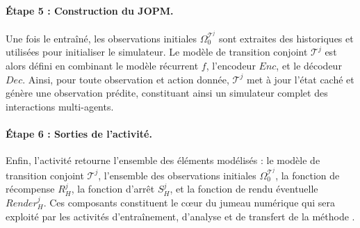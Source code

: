 \paragraph{Étape 5 : Construction du JOPM.}
Une fois le  entraîné, les observations initiales $\Omega^{\mathcal{T}^j}_0$ sont extraites des historiques et utilisées pour initialiser le simulateur.
Le modèle de transition conjoint $\mathcal{T}^j$ est alors défini en combinant le modèle récurrent $f$, l'encodeur $Enc$, et le décodeur $Dec$.
Ainsi, pour toute observation et action donnée, $\mathcal{T}^j$ met à jour l'état caché et génère une observation prédite, constituant ainsi un simulateur complet des interactions multi-agents.

\paragraph{Étape 6 : Sorties de l'activité.}
Enfin, l'activité retourne l'ensemble des éléments modélisés : le modèle de transition conjoint $\mathcal{T}^j$, l'ensemble des observations initiales $\Omega^{\mathcal{T}^j}_0$, la fonction de récompense $R^j_H$, la fonction d'arrêt $S^j_H$, et la fonction de rendu éventuelle $Render^j_H$.
Ces composants constituent le cœur du jumeau numérique qui sera exploité par les activités d'entraînement, d'analyse et de transfert de la méthode .


